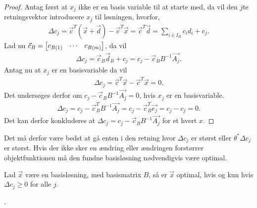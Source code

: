 \begin{proof}
Antag først at $x_j$ ikke er en basis variable til at starte med, da vil den $j$te retningsvektor introducere $x_j$ til løsningen, hvorfor,
\begin{align*}
\Delta c_j = \vec{c}^T(\vec{x}+ \vec{d}) - \vec{c}^T\vec{x} = \vec{c}^T\vec{d} = \sum_{i \in I_B} c_i d_i + c_j.
\end{align*}
Lad nu $\vec{c}_B = \begin{bmatrix} c_{B(1)}& \cdots & c_{B(m)} \end{bmatrix}$, da vil
\begin{align}
\Delta c_j =\vec{c}_B\vec{d}_B+ c_j = c_j-\vec{c}_B B^{-1}\vec{A_j}.
\end{align}
Antag nu at $x_j$ er en basisvariable da vil 
\begin{align*}
\Delta c_j = \vec{c}^T\vec{x}- \vec{c}^T\vec{x} = 0.
\end{align*}
Det undersøges derfor om $ c_j-\vec{c}_B B^{-1}\vec{A_j}= 0$, hvis $x_j$ er en basisvariable.
\begin{align*}
 \Delta c_j = c_j-\vec{c}_B^T B^{-1}\vec{A_j} = c_j - \vec{c}_B^T \vec{e_j} = c_j - c_j = 0.
\end{align*}
Det kan derfor konkluderes at $\Delta c_j = c_j-\vec{c}_B B^{-1}\vec{A_j}$ for et hvert $x$.
\end{proof}
Det må derfor være bedst at gå enten i den retning hvor $\Delta c_j$ er størst eller $\theta^*\Delta c_j$ er størst. 
Hvis der ikke sker en ændring eller ændringen forstørrer objektfunktionen må den fundne basisløsning nødvendigvis være optimal.
\begin{stn}
Lad $\vec{x}$ være en basisløsning, med basismatrix $B$, så er $\vec{x}$ optimal, hvis og kun hvis $\Delta c_j \geq 0$ for alle $j$.
\label{stn:optimalDeltaC}
\end{stn}.
